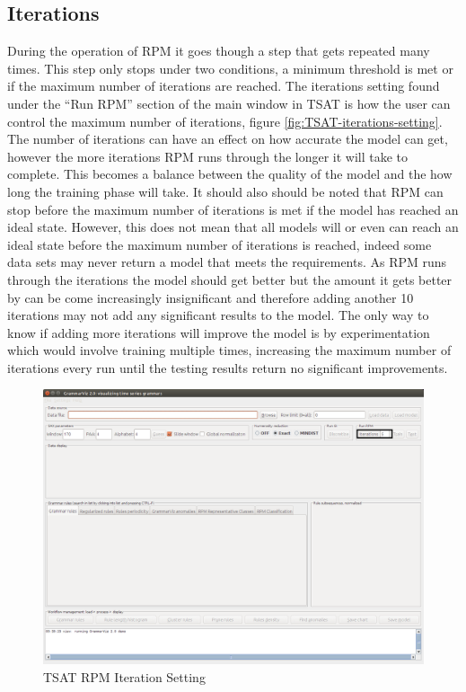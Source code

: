 \documentclass[letterpaper, 12pt]{article}
\begin{document}
\newpage
\subsection{Iterations}
During the operation of RPM it goes though a step that gets repeated many times. This step only stops under two conditions, a minimum threshold is met or if the maximum number of iterations are reached. The iterations setting found under the ``Run RPM'' section of the main window in TSAT is how the user can control the maximum number of iterations, figure \ref{fig:TSAT-iterations-setting}. The number of iterations can have an effect on how accurate the model can get, however the more iterations RPM runs through the longer it will take to complete. This becomes a balance between the quality of the model and the how long the training phase will take. It should also should be noted that RPM can stop before the maximum number of iterations is met if the model has reached an ideal state. However, this does not mean that all models will or even can reach an ideal state before the maximum number of iterations is reached, indeed some data sets may never return a model that meets the requirements. As RPM runs through the iterations the model should get better but the amount it gets better by can be come increasingly insignificant and therefore adding another 10 iterations may not add any significant results to the model. The only way to know if adding more iterations will improve the model is by experimentation which would involve training multiple times, increasing the maximum number of iterations every run until the testing results return no significant improvements.

\begin{figure}[H]
  \includegraphics[width=\textwidth]{TSAT-iterations-setting}
  \caption{TSAT RPM Iteration Setting}
  \label{fig:TSAT-iteration-setting}
\end{figure}
\end{document}
